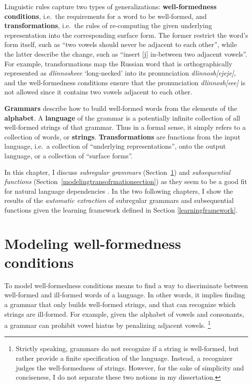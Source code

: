 Linguistic rules capture two types of generalizations: \textbf{well-formedness conditions}, i.e.\ the requirements for a word to be well-formed, and \textbf{transformations}, i.e.\ the rules of re-computing the given underlying representation into the corresponding surface form.
The former restrict the word's form itself, such as ``two vowels should never be adjacent to each other'', while the latter describe the change, such as ``insert {[}j{]} in-between two adjacent vowels''.
For example, transformations map the Russian word that is orthographically represented as \emph{dlinnosheee} `long-necked' into its pronunciation \emph{dlinnosh[ejeje]}, and the well-formedness conditions ensure that the pronunciation \emph{dlinnosh[eee]} is not allowed since it contains two vowels adjacent to each other.


\textbf{Grammars} describe how to build well-formed words from the elements of the \textbf{alphabet}.
A \textbf{language} of the grammar is a potentially infinite collection of all well-formed strings of that grammar.
Thus in a formal sense, it simply refers to a collection of words, or \textbf{strings}.
\textbf{Transformations} are functions from the input language, i.e.\ a collection of ``underlying representations'', onto the output language, or a collection of ``surface forms''.


In this chapter, I discuss \emph{subregular grammars} (Section~\ref{wellformednesssection}) and \emph{subsequential functions} (Section~\ref{modelingtransofrmationsection}) as they seem to be a good fit for natural language dependencies \citep[i.a.]{Heinz11part1,HeinzRawal11,GainorLai12,Heinz-Lai-2013-VHS,AksenovaEtAl16,Graf17CLSpres,ChandleeHeinz2018}.
In the two following chapters, I show the results of the \emph{automatic extraction} of subregular grammars and subsequential functions given the learning framework defined in Section \ref{learningframework}.


\section{Modeling well-formedness conditions}
\label{wellformednesssection}

To model well-formedness conditions means to find a way to discriminate between well-formed and ill-formed words of a language.
In other words, it implies finding a grammar that only builds well-formed strings, and that can recognize which strings are ill-formed.
For example, given the alphabet of vowels and consonants, a grammar can prohibit vowel hiatus by penalizing adjacent vowels.%
\footnote{Strictly speaking, grammars do not recognize if a string is well-formed, but rather provide a finite specification of the language.
Instead, a recognizer judges the well-formedness of strings.
However, for the sake of simplicity and conciseness, I do not separate these two notions in my dissertation.
}

